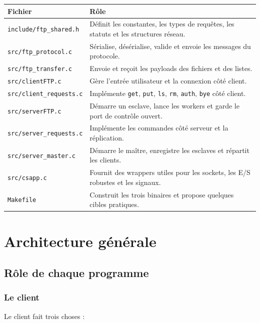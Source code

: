 \documentclass[a4paper,11pt]{article}
\begin{document}
\begin{center}
\small
\begin{tabularx}{\textwidth}{@{}L{0.26\textwidth}L{0.66\textwidth}@{}}
\toprule
\textbf{Fichier} & \textbf{Rôle} \\
\midrule
\texttt{include/ftp\_shared.h} & Définit les constantes, les types de requêtes, les statuts et les structures réseau. \\
\texttt{src/ftp\_protocol.c} & Sérialise, désérialise, valide et envoie les messages du protocole. \\
\texttt{src/ftp\_transfer.c} & Envoie et reçoit les payloads des fichiers et des listes. \\
\texttt{src/clientFTP.c} & Gère l'entrée utilisateur et la connexion côté client. \\
\texttt{src/client\_requests.c} & Implémente \texttt{get}, \texttt{put}, \texttt{ls}, \texttt{rm}, \texttt{auth}, \texttt{bye} côté client. \\
\texttt{src/serverFTP.c} & Démarre un esclave, lance les workers et garde le port de contrôle ouvert. \\
\texttt{src/server\_requests.c} & Implémente les commandes côté serveur et la réplication. \\
\texttt{src/server\_master.c} & Démarre le maître, enregistre les esclaves et répartit les clients. \\
\texttt{src/csapp.c} & Fournit des wrappers utiles pour les sockets, les E/S robustes et les signaux. \\
\texttt{Makefile} & Construit les trois binaires et propose quelques cibles pratiques. \\
\bottomrule
\end{tabularx}
\end{center}
\newpage
\section{Architecture générale}

\subsection{Rôle de chaque programme}

\subsubsection{Le client}

Le client fait trois choses :
\end{document}
